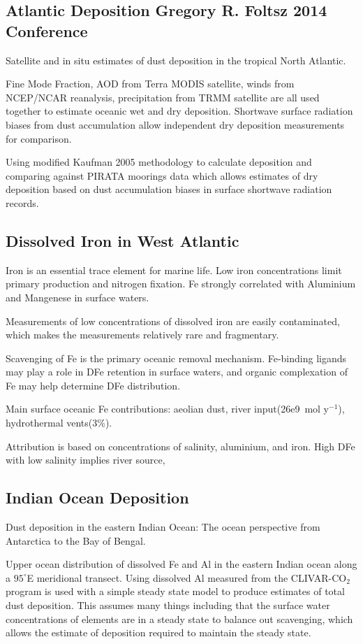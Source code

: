 \subsection{Atlantic Deposition Gregory R. Foltsz 2014 Conference}
Satellite and in situ estimates of dust deposition in the tropical North Atlantic.

Fine Mode Fraction, AOD from Terra MODIS satellite, winds from NCEP/NCAR reanalysis, precipitation from TRMM satellite are all used together to estimate oceanic wet and dry deposition.
Shortwave surface radiation biases from dust accumulation allow independent dry deposition measurements for comparison.

Using modified Kaufman 2005 methodology to calculate deposition and comparing against PIRATA moorings data which allows estimates of dry deposition based on dust accumulation biases in surface shortwave radiation records.

\subsection{Dissolved Iron in West Atlantic \cite{Rijkenberg_2014}}
Iron is an essential trace element for marine life.
Low iron concentrations limit primary production and nitrogen fixation.
Fe strongly correlated with Aluminium and Mangenese in surface waters.

Measurements of low concentrations of dissolved iron are easily contaminated, which makes the measurements relatively rare and fragmentary.

Scavenging of Fe is the primary oceanic removal mechanism. 
Fe-binding ligands may play a role in DFe retention in surface waters, and organic complexation of Fe may help determine DFe distribution.

Main surface oceanic Fe contributions: aeolian dust, river input(26e9~mol y$^{-1}$), hydrothermal vents(3\%).

Attribution is based on concentrations of salinity, aluminium, and iron. 
High DFe with low salinity implies river source, 

\subsection{Indian Ocean Deposition \cite{Grand_2015}}
Dust deposition in the eastern Indian Ocean: The ocean perspective from Antarctica to the Bay of Bengal.

Upper ocean distribution of dissolved Fe and Al in the eastern Indian ocean along a $95^{\circ}$E meridional transect.
Using dissolved Al measured from the CLIVAR-CO$_{2}$ program is used with a simple steady state model to produce estimates of total dust deposition. This assumes many things including that the surface water concentrations of elements are in a steady state to balance out scavenging, which allows the estimate of deposition required to maintain the steady state.

